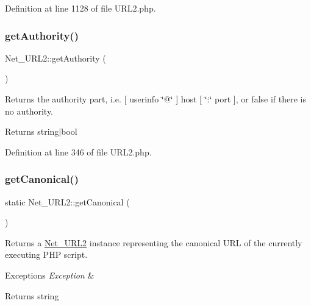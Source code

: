 Definition at line 1128 of file U\+R\+L2.\+php.

\mbox{\label{classNet__URL2_af736dde13f102618a706c1cb47868b38}} 
\subsubsection{\texorpdfstring{get\+Authority()}{getAuthority()}}
{\footnotesize\ttfamily Net\+\_\+\+U\+R\+L2\+::get\+Authority (\begin{DoxyParamCaption}{ }\end{DoxyParamCaption})}

Returns the authority part, i.\+e. \mbox{[} userinfo \char`\"{}@\char`\"{} \mbox{]} host \mbox{[} \char`\"{}\+:\char`\"{} port \mbox{]}, or false if there is no authority.

\begin{DoxyReturn}{Returns}
string$\vert$bool 
\end{DoxyReturn}


Definition at line 346 of file U\+R\+L2.\+php.

\mbox{\label{classNet__URL2_ae11b6a2c904b4d60e63d75a1bfe508a9}} 
\subsubsection{\texorpdfstring{get\+Canonical()}{getCanonical()}}
{\footnotesize\ttfamily static Net\+\_\+\+U\+R\+L2\+::get\+Canonical (\begin{DoxyParamCaption}{ }\end{DoxyParamCaption})\hspace{0.3cm}{\ttfamily [static]}}

Returns a \hyperlink{classNet__URL2}{Net\+\_\+\+U\+R\+L2} instance representing the canonical U\+RL of the currently executing P\+HP script.


\begin{DoxyExceptions}{Exceptions}
{\em Exception} & \\
\hline
\end{DoxyExceptions}
\begin{DoxyReturn}{Returns}
string 
\end{DoxyReturn}


